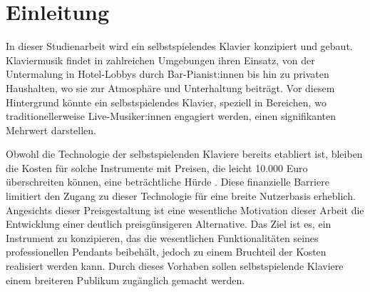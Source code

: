 \chapter{Einleitung} \label{einleitung}

\nocite{*}

In dieser Studienarbeit wird ein selbstspielendes Klavier konzipiert und gebaut.
Klaviermusik findet in zahlreichen Umgebungen ihren Einsatz, von der Untermalung in Hotel-Lobbys durch Bar-Pianist:innen bis hin zu privaten Haushalten,
wo sie zur Atmosphäre und Unterhaltung beiträgt.
Vor diesem Hintergrund könnte ein selbstspielendes Klavier, speziell in Bereichen, wo traditionellerweise Live-Musiker:innen engagiert werden,
einen signifikanten Mehrwert darstellen.

Obwohl die Technologie der selbstspielenden Klaviere bereits etabliert ist, bleiben die Kosten für solche Instrumente mit Preisen,
die leicht 10.000 Euro überschreiten können, eine beträchtliche Hürde \cite*{YamahaU1}.
Diese finanzielle Barriere limitiert den Zugang zu dieser Technologie für eine breite Nutzerbasis erheblich.
Angesichts dieser Preisgestaltung ist eine wesentliche Motivation dieser Arbeit die Entwicklung einer deutlich preisgünsigeren Alternative.
Das Ziel ist es, ein Instrument zu konzipieren, das die wesentlichen Funktionalitäten seines professionellen Pendants beibehält,
jedoch zu einem Bruchteil der Kosten realisiert werden kann.
Durch dieses Vorhaben sollen selbstspielende Klaviere einem breiteren Publikum zugänglich gemacht werden.



